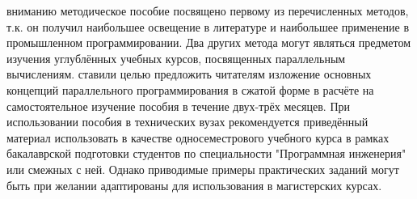 {\begin{enumerate}
	\end{enumerate}
	 вниманию методическое пособие посвящено первому из перечисленных методов, т.к. он получил наибольшее освещение в литературе и наибольшее применение в промышленном программировании. Два других метода могут являться предметом изучения углублённых учебных курсов, посвященных параллельным вычислениям.
	 ставили целью предложить читателям изложение основных концепций параллельного программирования в сжатой форме в расчёте на самостоятельное изучение пособия в течение двух-трёх месяцев. При использовании пособия в технических вузах рекомендуется приведённый материал использовать в качестве односеместрового учебного курса в рамках бакалаврской подготовки студентов по специальности "Программная инженерия" или смежных с ней. Однако приводимые примеры практических заданий могут быть при желании адаптированы для использования в магистерских курсах.

}